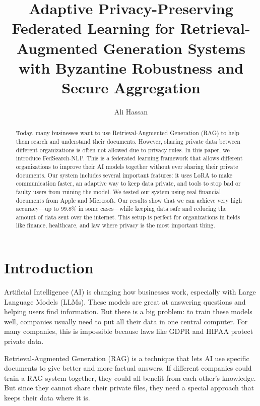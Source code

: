 \documentclass[acmsmall,screen]{acmart}
\begin{document}
\pagestyle{empty}

\title{Adaptive Privacy-Preserving Federated Learning for Retrieval-Augmented Generation Systems with Byzantine Robustness and Secure Aggregation}

\author{Ali Hassan}

\begin{abstract}
Today, many businesses want to use Retrieval-Augmented Generation (RAG) to help them search and understand their documents. However, sharing private data between different organizations is often not allowed due to privacy rules. In this paper, we introduce FedSearch-NLP. This is a federated learning framework that allows different organizations to improve their AI models together without ever sharing their private documents. Our system includes several important features: it uses LoRA to make communication faster, an adaptive way to keep data private, and tools to stop bad or faulty users from ruining the model. We tested our system using real financial documents from Apple and Microsoft. Our results show that we can achieve very high accuracy—up to 99.8\% in some cases—while keeping data safe and reducing the amount of data sent over the internet. This setup is perfect for organizations in fields like finance, healthcare, and law where privacy is the most important thing.
\end{abstract}


\maketitle

\section{Introduction}

Artificial Intelligence (AI) is changing how businesses work, especially with Large Language Models (LLMs). These models are great at answering questions and helping users find information. But there is a big problem: to train these models well, companies usually need to put all their data in one central computer. For many companies, this is impossible because laws like GDPR and HIPAA protect private data.

Retrieval-Augmented Generation (RAG) is a technique that lets AI use specific documents to give better and more factual answers. If different companies could train a RAG system together, they could all benefit from each other's knowledge. But since they cannot share their private files, they need a special approach that keeps their data where it is.
\end{document}
